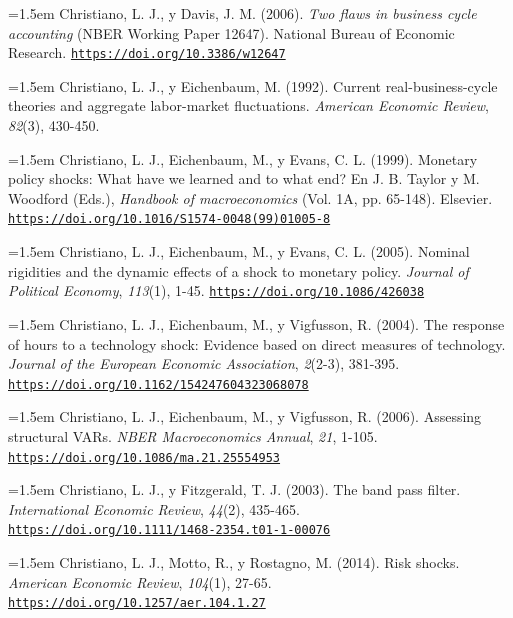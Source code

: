 \documentclass[10pt,a4paper]{article}
\begin{document}
\noindent\hangindent=1.5em Christiano, L. J., y Davis, J. M. (2006). \textit{Two flaws in business cycle accounting} (NBER Working Paper 12647). National Bureau of Economic Research. \href{https://doi.org/10.3386/w12647}{\nolinkurl{https://doi.org/10.3386/w12647}}

\noindent\hangindent=1.5em Christiano, L. J., y Eichenbaum, M. (1992). Current real-business-cycle theories and aggregate labor-market fluctuations. \textit{American Economic Review}, \textit{82}(3), 430-450.

{\sloppy\noindent\hangindent=1.5em Christiano, L. J., Eichenbaum, M., y Evans, C. L. (1999). Monetary policy shocks: What have we learned and to what end? En J. B. Taylor y M. Woodford (Eds.), \textit{Handbook of macroeconomics} (Vol. 1A, pp. 65-148). Elsevier. \href{https://doi.org/10.1016/S1574-0048(99)01005-8}{\nolinkurl{https://doi.org/10.1016/S1574-0048(99)01005-8}}\par}

\noindent\hangindent=1.5em Christiano, L. J., Eichenbaum, M., y Evans, C. L. (2005). Nominal rigidities and the dynamic effects of a shock to monetary policy. \textit{Journal of Political Economy}, \textit{113}(1), 1-45. \href{https://doi.org/10.1086/426038}{\nolinkurl{https://doi.org/10.1086/426038}}

\noindent\hangindent=1.5em Christiano, L. J., Eichenbaum, M., y Vigfusson, R. (2004). The response of hours to a technology shock: Evidence based on direct measures of technology. \textit{Journal of the European Economic Association}, \textit{2}(2-3), 381-395. \href{https://doi.org/10.1162/154247604323068078}{\nolinkurl{https://doi.org/10.1162/154247604323068078}}

\noindent\hangindent=1.5em Christiano, L. J., Eichenbaum, M., y Vigfusson, R. (2006). Assessing structural VARs. \textit{NBER Macroeconomics Annual}, \textit{21}, 1-105. \href{https://doi.org/10.1086/ma.21.25554953}{\nolinkurl{https://doi.org/10.1086/ma.21.25554953}}

\noindent\hangindent=1.5em Christiano, L. J., y Fitzgerald, T. J. (2003). The band pass filter. \textit{International Economic Review}, \textit{44}(2), 435-465. \href{https://doi.org/10.1111/1468-2354.t01-1-00076}{\nolinkurl{https://doi.org/10.1111/1468-2354.t01-1-00076}}

\noindent\hangindent=1.5em Christiano, L. J., Motto, R., y Rostagno, M. (2014). Risk shocks. \textit{American Economic Review}, \textit{104}(1), 27-65. \href{https://doi.org/10.1257/aer.104.1.27}{\nolinkurl{https://doi.org/10.1257/aer.104.1.27}}
\end{document}
